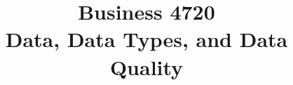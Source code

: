 \documentclass{article}
\title{Business 4720\\ \vspace{\baselineskip}
Data, Data Types, and Data Quality}
\begin{document}
\maketitle

\vfill

\clearpage


\end{document}
